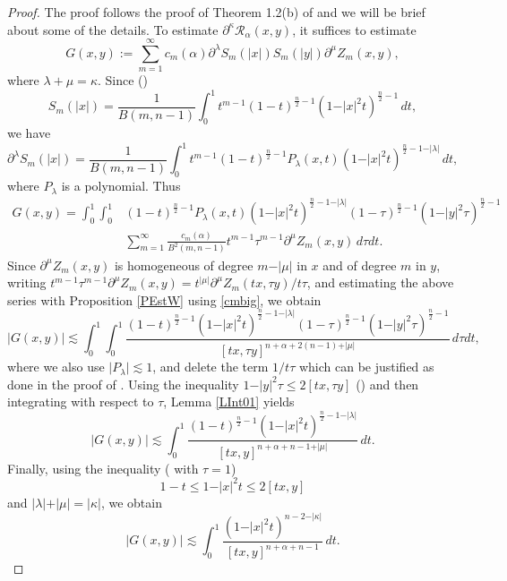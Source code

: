 \documentclass{amsart}
\theoremstyle{definition}
\theoremstyle{remark}
\begin{document}
\begin{proof}
The proof follows the proof of Theorem 1.2(b) of \cite{U} and we will be
brief about some of the details.
To estimate $\partial^\kappa\mathcal R_\alpha(x,y)$, it suffices to estimate
\begin{equation*}
G(x,y):=\sum_{m=1}^\infty
c_m(\alpha)\partial^\lambda S_m(\vert x\vert)S_m(\vert y\vert)
\partial^\mu Z_m(x,y),
\end{equation*}
where $\lambda+\mu=\kappa$.
Since (\cite[Eqn. (22)]{U})
\begin{equation*}
S_m(\vert x\vert)
=\frac{1}{B(m,n-1)}
\int_0^1 t^{m-1}(1-t)^{\frac{n}{2}-1}(1-\vert x\vert^2 t)^{\frac{n}{2}-1}\,dt,
\end{equation*}
we have
\begin{equation*}
\partial^\lambda S_m(\vert x\vert)
=\frac{1}{B(m,n-1)}
\int_0^1 t^{m-1}(1-t)^{\frac{n}{2}-1}P_\lambda(x,t)
(1-\vert x\vert^2 t)^{\frac{n}{2}-1-\vert\lambda\vert}\,dt,
\end{equation*}
where $P_\lambda$ is a polynomial.
Thus
\begin{align*}
G(x,y)=\int_0^1\int_0^1
&(1-t)^{\frac{n}{2}-1}P_\lambda(x,t)
(1-\vert x\vert^2t)^{\frac{n}{2}-1-\vert\lambda\vert}
(1-\tau)^{\frac{n}{2}-1}(1-\vert y\vert^2 \tau)^{\frac{n}{2}-1}\\
&\sum_{m=1}^\infty\frac{c_m(\alpha)}{B^2(m,n-1)}
t^{m-1}\tau^{m-1}\partial^\mu Z_m(x,y)\,d\tau dt.
\end{align*}
Since $\partial^\mu Z_m(x,y)$ is homogeneous of degree $m-\vert\mu\vert$ in $x$
and of degree $m$ in $y$, writing
$t^{m-1}\tau^{m-1}\partial^\mu Z_m(x,y)
=t^{\vert\mu\vert}\partial^\mu Z_m(tx,\tau y)/t\tau$, and estimating the above
series with Proposition \ref{PEstW} using \eqref{cmbig}, we obtain
\begin{equation*}
\vert G(x,y)\vert
\lesssim \int_0^1\int_0^1
\frac{(1-t)^{\frac{n}{2}-1}(1-\vert x\vert^2t)^{\frac{n}{2}-1-\vert\lambda\vert}
(1-\tau)^{\frac{n}{2}-1}(1-\vert y\vert^2 \tau)^{\frac{n}{2}-1}}
{[tx,\tau y]^{n+\alpha+2(n-1)+\vert\mu\vert}}\,d\tau dt,
\end{equation*}
where we also use $\vert P_\lambda\vert\lesssim 1$, and delete the term $1/t\tau$
which can be justified as done in the proof of \cite[Theorem 4.4]{U}.
Using the inequality $1-\vert y\vert^2\tau\le 2[tx,\tau y]$ (\cite[Eqn.~(36)]{U})
and then integrating
with respect to $\tau$, Lemma \ref{LInt01} yields
\begin{equation*}
\vert G(x,y)\vert
\lesssim \int_0^1
\frac{(1-t)^{\frac{n}{2}-1}(1-\vert x\vert^2t)^{\frac{n}{2}-1-\vert\lambda\vert}}
{[tx,y]^{n+\alpha+n-1+\vert\mu\vert}}\,dt.
\end{equation*}
Finally, using the inequality (\cite[Eqn.~(35)]{U} with $\tau=1$)
\begin{equation}\label{ineq}
1-t\le 1-\vert x\vert^2 t\le 2[tx,y]
\end{equation}
and $\vert\lambda\vert+\vert\mu\vert=\vert\kappa\vert$, we obtain
\begin{equation*}
\vert G(x,y)\vert
\lesssim \int_0^1
\frac{(1-\vert x\vert^2t)^{n-2-\vert\kappa\vert}}
{[tx,y]^{n+\alpha+n-1}}\,dt.
\end{equation*}


\end{proof}
\end{document}
